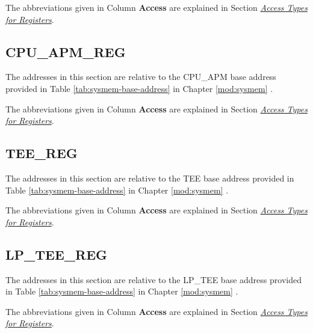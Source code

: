 \documentclass[main\_\_EN.tex]{subfiles}
\begin{document}
The abbreviations given in Column \textbf{Access} are explained in Section \hyperref[glossary-access-types]{\textit{Access Types for Registers}}.



\subsection{CPU\_APM\_REG}
\label{sec:permctrl-reg-cpu}

The addresses in this section are relative to the CPU\_APM base address provided in Table \ref{tab:sysmem-base-address} in Chapter \ref{mod:sysmem} \textit{}.

The abbreviations given in Column \textbf{Access} are explained in Section \hyperref[glossary-access-types]{\textit{Access Types for Registers}}.



\subsection{TEE\_REG}
\label{sec:permctrl-reg-hp-tee}

The addresses in this section are relative to the TEE base address provided in Table \ref{tab:sysmem-base-address} in Chapter \ref{mod:sysmem} \textit{}.

The abbreviations given in Column \textbf{Access} are explained in Section \hyperref[glossary-access-types]{\textit{Access Types for Registers}}.



\subsection{LP\_TEE\_REG}
\label{sec:permctrl-reg-lp-tee}

The addresses in this section are relative to the LP\_TEE base address provided in Table \ref{tab:sysmem-base-address} in Chapter \ref{mod:sysmem} \textit{}.

The abbreviations given in Column \textbf{Access} are explained in Section \hyperref[glossary-access-types]{\textit{Access Types for Registers}}.



\end{document}
